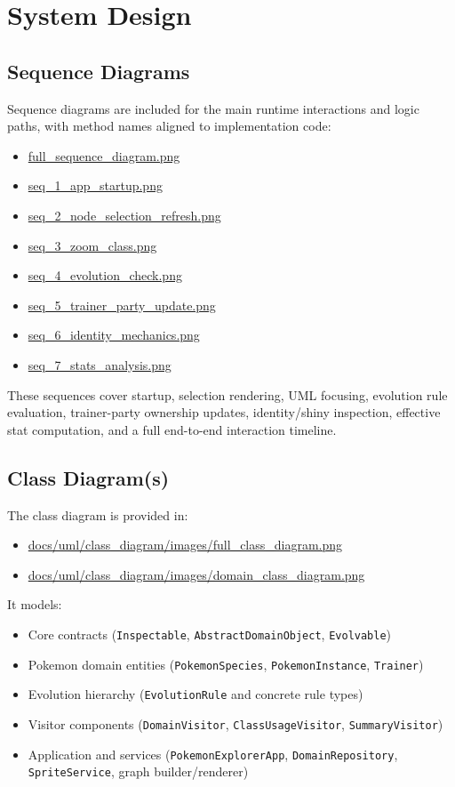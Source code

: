 \documentclass[12pt]{article}
\begin{document}
\newpage
\section*{System Design}

\subsection*{Sequence Diagrams}
Sequence diagrams are included for the main runtime interactions and logic
paths, with method names aligned to implementation code:
\begin{itemize}
    \item \url{full_sequence_diagram.png}
    \item \url{seq_1_app_startup.png}
    \item \url{seq_2_node_selection_refresh.png}
    \item \url{seq_3_zoom_class.png}
    \item \url{seq_4_evolution_check.png}
    \item \url{seq_5_trainer_party_update.png}
    \item \url{seq_6_identity_mechanics.png}
    \item \url{seq_7_stats_analysis.png}
\end{itemize}

These sequences cover startup, selection rendering, UML focusing, evolution
rule evaluation, trainer-party ownership updates, identity/shiny inspection,
effective stat computation, and a full end-to-end interaction timeline.

\subsection*{Class Diagram(s)}
The class diagram is provided in:
\begin{itemize}
    \item \url{docs/uml/class_diagram/images/full_class_diagram.png}
    \item \url{docs/uml/class_diagram/images/domain_class_diagram.png}
\end{itemize}

It models:
\begin{itemize}
    \item Core contracts (\texttt{Inspectable}, \texttt{AbstractDomainObject},
    \texttt{Evolvable})
    \item Pokemon domain entities (\texttt{PokemonSpecies},
    \texttt{PokemonInstance}, \texttt{Trainer})
    \item Evolution hierarchy (\texttt{EvolutionRule} and concrete rule types)
    \item Visitor components (\texttt{DomainVisitor},
    \texttt{ClassUsageVisitor}, \texttt{SummaryVisitor})
    \item Application and services (\texttt{PokemonExplorerApp},
    \texttt{DomainRepository}, \texttt{SpriteService}, graph builder/renderer)
\end{itemize}
\end{document}
